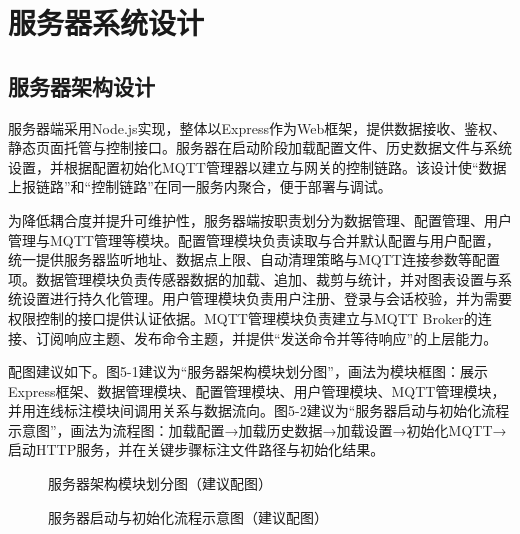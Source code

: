 
\section{服务器系统设计}

\subsection{服务器架构设计}
\par 服务器端采用Node.js实现，整体以Express作为Web框架，提供数据接收、鉴权、静态页面托管与控制接口。服务器在启动阶段加载配置文件、历史数据文件与系统设置，并根据配置初始化MQTT管理器以建立与网关的控制链路。该设计使“数据上报链路”和“控制链路”在同一服务内聚合，便于部署与调试。
\par 为降低耦合度并提升可维护性，服务器端按职责划分为数据管理、配置管理、用户管理与MQTT管理等模块。配置管理模块负责读取与合并默认配置与用户配置，统一提供服务器监听地址、数据点上限、自动清理策略与MQTT连接参数等配置项。数据管理模块负责传感器数据的加载、追加、裁剪与统计，并对图表设置与系统设置进行持久化管理。用户管理模块负责用户注册、登录与会话校验，并为需要权限控制的接口提供认证依据。MQTT管理模块负责建立与MQTT Broker的连接、订阅响应主题、发布命令主题，并提供“发送命令并等待响应”的上层能力。

\par 配图建议如下。图5-1建议为“服务器架构模块划分图”，画法为模块框图：展示Express框架、数据管理模块、配置管理模块、用户管理模块、MQTT管理模块，并用连线标注模块间调用关系与数据流向。图5-2建议为“服务器启动与初始化流程示意图”，画法为流程图：加载配置→加载历史数据→加载设置→初始化MQTT→启动HTTP服务，并在关键步骤标注文件路径与初始化结果。
\begin{figure}[H]
\centering
{}
\caption{服务器架构模块划分图（建议配图）}
\label{fig:server_modules}
\end{figure}
\begin{figure}[H]
\centering
{}
\caption{服务器启动与初始化流程示意图（建议配图）}
\label{fig:server_init}
\end{figure}


